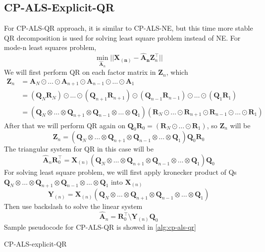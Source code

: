 \documentclass{article}
\newcommand{\mat}[1]{\mathbf{#1}}
\begin{document}
\subsection{CP-ALS-Explicit-QR}
For CP-ALS-QR approach, it is similar to CP-ALS-NE, but this time more stable QR decomposition is used for solving least square problem instead of NE.
For mode-n least squares problem,
$$\min_{\mat{\hat{A}}_n}||\mat{X_{(n)}} - {\mat{\hat{A}_n}}\mat{Z}^\top_n ||$$
We will first perform QR on each factor matrix in $\mat{Z}_n$, which 
\begin{align}
  \mat{Z}_n &= \mat{A}_N \odot \dots \odot \mat{A}_{n+1} \odot \mat{A}_{n-1} \odot \dots \odot \mat{A}_1 \nonumber \\
  &= (\mat{Q}_N\mat{R}_N) \odot \dots \odot (\mat{Q}_{n+1}\mat{R}_{n+1}) \odot (\mat{Q}_{n-1}\mat{R}_{n-1}) \odot \dots \odot (\mat{Q}_1\mat{R}_1) \nonumber \\
  &= (\mat{Q}_N \otimes \dots \otimes \mat{Q}_{n+1} \otimes \mat{Q}_{n-1} \otimes \dots \otimes \mat{Q}_1)(\mat{R}_N \odot \dots \odot \mat{R}_{n+1} \odot \mat{R}_{n-1} \odot \dots \odot \mat{R}_1)\nonumber  
\end{align}
After that we will perform QR again on $\mat{Q}_0\mat{R}_0=(\mat{R}_N \odot \dots \odot \mat{R}_1)$, so $\mat{Z}_n$ will be
$$\mat{Z}_n = (\mat{Q}_N \otimes \dots \otimes \mat{Q}_{n+1} \otimes \mat{Q}_{n-1} \otimes \dots \otimes \mat{Q}_1)\mat{Q}_0\mat{R}_0$$
The triangular system for QR in this case will be 
\begin{equation}
  \hat{\mat{A}}_n\mat{R}_0^\top = \mat{X}_{(n)}(\mat{Q}_N \otimes \dots \otimes \mat{Q}_{n+1} \otimes \mat{Q}_{n-1} \otimes \dots \otimes \mat{Q}_1)\mat{Q}_0 
  \label{eq:CP-EXP-QR}
\end{equation}
For solving least square problem, we will first apply kronecker product of Qs $\mat{Q}_N \otimes \dots \otimes \mat{Q}_{n+1} \otimes \mat{Q}_{n-1} \otimes \dots \otimes \mat{Q}_1$ into $\mat{X}_{(n)}$
$$\mat{Y}_{(n)} = \mat{X}_{(n)}(\mat{Q}_N \otimes \dots \otimes \mat{Q}_{n+1} \otimes \mat{Q}_{n-1} \otimes \dots \otimes \mat{Q}_1)$$
Then use backslash to solve the linear system
\begin{equation}
  \hat{\mat{A}}_n = \mat{R}_0^\top \text{\textbackslash} \mat{Y}_{(n)}\mat{Q}_0
\end{equation}
Sample pseudocode for CP-ALS-QR is showed in \cref{alg:cp-als-qr}
\begin{algorithm}
  \caption{CP-ALS-explicit-QR}
  \label{alg:cp-als-qr}
  
\end{algorithm}
\end{document}
